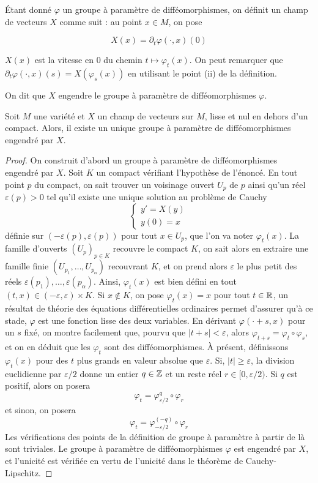 Étant donné $\varphi$ un groupe à paramètre de difféomorphismes, on définit un champ de 
vecteurs $X$ comme suit : au point $x\in M$, on pose 

\[
    X(x)=\partial_t\varphi(\cdot,x)(0)
\]

$X(x)$ est la vitesse en $0$ du chemin $t\mapsto\varphi_t(x)$.
On peut remarquer que $\partial_t\varphi(\cdot,x)(s)=X(\varphi_s(x))$ en utilisant le point 
(ii) de la définition.

On dit que $X$ engendre le groupe à paramètre de difféomorphismes $\varphi$.

\begin{prop}
    Soit $M$ une variété et $X$ un champ de vecteurs sur $M$, lisse et nul en dehors d'un 
    compact. 
    Alors, il existe un unique groupe à paramètre de difféomorphismes engendré par $X$.
\end{prop}

\begin{proof}
    On construit d'abord un groupe à paramètre de difféomorphismes engendré par $X$. 
    Soit $K$ un compact vérifiant l'hypothèse de l'énoncé. 
    En tout point $p$ du compact, on sait trouver un voisinage ouvert $U_p$ de $p$ ainsi qu'un 
    réel $\varepsilon(p)>0$ tel qu'il existe une unique solution au problème de Cauchy
    \[
        \left\lbrace\begin{array}{c} y' = X(y)\\ y(0)=x\end{array}\right.
    \]
    définie sur $(-\varepsilon(p),\varepsilon(p))$ pour tout $x\in U_p$, que l'on va noter 
    $\varphi_t(x)$.
    La famille d'ouverts $(U_p)_{p\in K}$ recouvre le compact $K$, on sait alors en extraire 
    une famille finie $(U_{p_1},\dots,U_{p_\alpha})$ recouvrant $K$, et on prend alors 
    $\varepsilon$ le plus petit des réels $\varepsilon(p_1),\dots,\varepsilon(p_\alpha)$.
    Ainsi, $\varphi_t(x)$ est bien défini en tout $(t,x)\in(-\varepsilon,\varepsilon)\times K$. 
    Si $x\notin K$, on pose $\varphi_t(x)=x$ pour tout $t\in\operatorname{\mathbb R}$, un résultat de théorie des 
    équations différentielles ordinaires permet d'assurer qu'à ce stade, $\varphi$ est une 
    fonction lisse des deux variables.
    En dérivant $\varphi(\cdot+s,x)$ pour un $s$ fixé, on montre facilement que, pourvu que 
    $|t+s|<\varepsilon$, alors $\varphi_{t+s}=\varphi_t\circ\varphi_s$, et on en déduit que 
    les $\varphi_t$ sont des difféomorphismes.
    À présent, définissons $\varphi_t(x)$ pour des $t$ plus grands en valeur absolue que 
    $\varepsilon$.
    Si, $|t|\geq\varepsilon$, la division euclidienne par $\varepsilon/2$ donne un entier 
    $q\in\operatorname{\mathbb Z}$ et un reste réel $r\in[0,\varepsilon/2)$.
    Si $q$ est positif, alors on posera 
    \[
        \varphi_t=\varphi_{\varepsilon/2}^q\circ\varphi_r
    \]
    et sinon, on posera 
    \[
        \varphi_t=\varphi_{-\varepsilon/2}^{(-q)}\circ\varphi_r
    \]
    Les vérifications des points de la définition de groupe à paramètre à partir de là 
    sont triviales.
    Le groupe à paramètre de difféomorphismes $\varphi$ est engendré par $X$, et l'unicité 
    est vérifiée en vertu de l'unicité dans le théorème de Cauchy-Lipschitz.
\end{proof}

